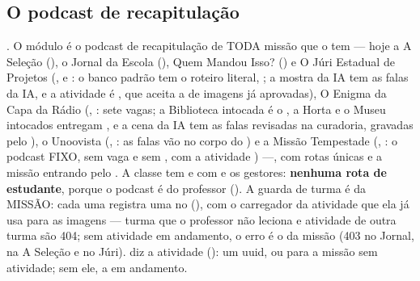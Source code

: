\subsection{O podcast de recapitulação}
\label{sec:api-podcast}

. O módulo  é o podcast de recapitulação de
TODA missão que o tem --- hoje a A Seleção (), o Jornal da Escola
(), Quem Mandou Isso? () e O Júri Estadual de
Projetos (,  e : o banco padrão
tem o roteiro literal, ; a mostra da IA tem as falas da IA, e a atividade é , que aceita a de imagens
já aprovadas), O Enigma da Capa da Rádio (, :
sete vagas; a Biblioteca intocada é o , a Horta e o Museu
intocados entregam , e a cena da IA tem as falas revisadas
na curadoria, gravadas pelo ), o Unoovista (, : as falas vão no
corpo do ) e a Missão Tempestade
(, : o podcast FIXO, sem vaga e sem
, com a atividade ) ---, com rotas únicas e
a missão entrando pelo . A classe tem  e
 com  e os gestores: \textbf{nenhuma rota de
estudante}, porque o podcast é do professor (). A guarda de turma
é da MISSÃO: cada uma registra uma  no 
(), com o carregador da atividade que ela já
usa para as imagens --- turma que o professor não leciona e atividade de outra
turma são 404; sem atividade em andamento, o erro é o da missão (403
 no Jornal, na A Seleção e no Júri).
 diz a atividade (): um uuid, ou 
para a missão sem atividade; sem ele, a em andamento.

